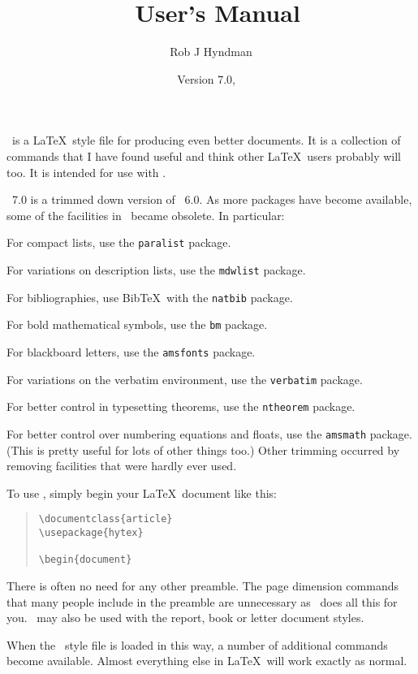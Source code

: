\documentclass[11pt]{article}
\newenvironment{commands}{\vspace{-\parskip}\begin{quote}}{\end{quote}\vspace{-\parskip}}
\begin{document}
\RaggedRight
\label{start}
\title{\HyTeX\ User's Manual}
\author{Rob J Hyndman}
\date{Version 7.0, \Month\ \Year}
\boxtitle
\hytextitle

\HyTeX\ is a \LaTeX\ style file	 for producing even better
documents. It is a collection of commands that I have found useful
and think other \LaTeX\ users probably will too.  It is intended for
use with \LaTeXe.


\HyTeX\ 7.0 is a trimmed down version of \HyTeX\ 6.0. As more
packages have become available, some of the facilities in \HyTeX\
became obsolete. In particular:\vspace*{-0.3cm}
\biz\itemsep=0pt
\item For compact lists, use the \verb|paralist| package.
\item For variations on description lists, use the \verb|mdwlist| package.
\item For bibliographies, use Bib\TeX\ with the \verb|natbib| package.
\item For bold mathematical symbols, use the \verb|bm| package.
\item For blackboard letters, use the \verb|amsfonts| package.
\item For variations on the verbatim environment, use the \verb|verbatim| package.
\item For better control in typesetting theorems, use the \verb|ntheorem| package.
\item For better control over numbering equations and floats, use the \verb|amsmath| package. (This is pretty useful for lots of other things too.)
\eiz
Other trimming occurred by removing facilities that were hardly ever used.


To use \HyTeX, simply begin your \LaTeX\ document like this:
\begin{commands}
\begin{verbatim}
\documentclass{article}
\usepackage{hytex}

\begin{document}
\end{verbatim}
\end{commands}
There is often no need for any other preamble.	The page dimension commands that
many people include in the preamble are unnecessary as \HyTeX\ does all this
for you.  \HyTeX\ may also be used with the report, book or letter document
styles.

When the \HyTeX\ style file is loaded in this way, a number of
additional commands become available.  Almost everything else in
\LaTeX\ will work exactly as normal.
\end{document}
